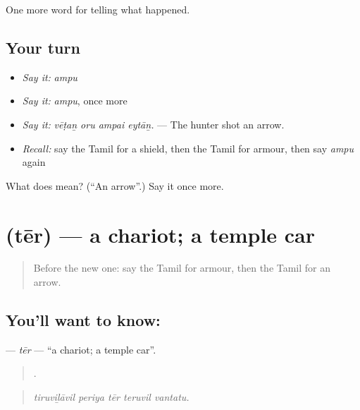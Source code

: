 \begin{grammarlens}[title={What you've built}]
One more word for telling what happened.
\end{grammarlens}

\subsection*{Your turn}
\begin{itemize}
\raggedright
  \item \emph{Say it:} \emph{ampu}
  \item \emph{Say it:} \emph{ampu}, once more
  \item \emph{Say it:} \emph{vēṭaṉ oru ampai eytāṉ.} — The hunter shot an arrow.
  \item \emph{Recall:} say the Tamil for a shield, then the Tamil for armour, then say \emph{ampu} again
\end{itemize}

\begin{tcolorbox}[breakable,colback=teal!4,colframe=teal!35!black,title={Before you move on}]
What does  mean? (\textquotedblleft{}An arrow\textquotedblright{}.) Say it once more.
\end{tcolorbox}
\section[\texorpdfstring{\ta{தேர்} (tēr)}{தேர் (tēr)}]{ (tēr) — a chariot; a temple car}

\label{lesson:TA-C334-ter}



\begin{quote}
Before the new one: say the Tamil for armour, then the Tamil for an arrow.
\end{quote}

\subsection*{You'll want to know: }
\textbf{} — \emph{tēr} — \textquotedblleft{}a chariot; a temple car\textquotedblright{}.

\begin{quote}
    .
\end{quote}

\begin{quote}
\emph{tiruviḻāvil periya tēr teruvil vantatu.}
\end{quote}

